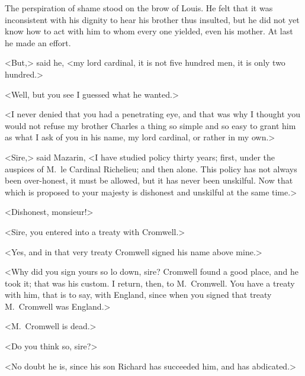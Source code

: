 The perspiration of shame stood on the brow of Louis. He felt that it was inconsistent with his dignity to hear his brother thus insulted, but he did not yet know how to act with him to whom every one yielded, even his mother. At last he made an effort.

<But,> said he, <my lord cardinal, it is not five hundred men, it is only two hundred.>

<Well, but you see I guessed what he wanted.>

<I never denied that you had a penetrating eye, and that was why I thought you would not refuse my brother Charles a thing so simple and so easy to grant him as what I ask of you in his name, my lord cardinal, or rather in my own.>

<Sire,> said Mazarin, <I have studied policy thirty years; first, under the auspices of M.~le Cardinal Richelieu; and then alone. This policy has not always been over-honest, it must be allowed, but it has never been unskilful. Now that which is proposed to your majesty is dishonest and unskilful at the same time.>

<Dishonest, monsieur!>

<Sire, you entered into a treaty with Cromwell.>

<Yes, and in that very treaty Cromwell signed his name above mine.>

<Why did you sign yours so lo down, sire? Cromwell found a good place, and he took it; that was his custom. I return, then, to M.~Cromwell. You have a treaty with him, that is to say, with England, since when you signed that treaty M.~Cromwell was England.>

<M.~Cromwell is dead.>

<Do you think so, sire?>

<No doubt he is, since his son Richard has succeeded him, and has abdicated.>

